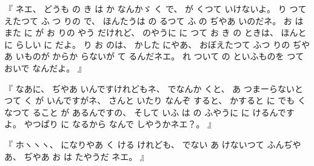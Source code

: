 %
『
ネエ、
%
どうも
の
き
は
か
なんかゞ
く
で、
%
が
くつて
いけないよ。
%
り
つて
えたつて%
ふ
つ
りの
で、
%
ほんたうは
の
るつて
ふ
の
ぢやあ
いのだネ。
%
お
は
また
に
が
お
りの
やう
だけれど、
%
のやうに
に
つて
お
き
の
ときは、
%
ほんとに
らしい
%
に
だよ。
%
り
お
のは、
%
かした
にやあ、
%
おぼえたつて
ふつ
りの
ぢやあ
いものが
からか
らないが
て
るんだネエ。
%
れ
ついて
の
といふものを
つて
おいで
なんだよ。
』

%
『
なあに、
%
ぢやあ
いんですけれどもネ、
%
でなんか
くと、
%
あ
つまーらないと
つて
く
が
いんですがネ、
%
さんと
いたり
なんぞ
すると、
%
かすると
に%
でも%
%
くなつて
ること
が
あるんですの、
%
そして
いふ
は
の%
ふやうに
に
けるんですよ。
%
やつぱり
に
なるから
なんで
しやうかネエ？。
』

%
『
ホヽヽヽ、
%
になりやあ
く
ける
けれども、
%
でない
あ
けないつて
ふんぢやあ、
%
ぢやあ
お
は
たやうだ
ネエ。
』

